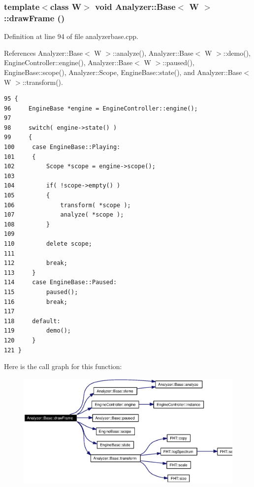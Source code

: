 \subsubsection{\setlength{\rightskip}{0pt plus 5cm}template$<$class W$>$ void {\bf Analyzer::Base}$<$ W $>$::draw\-Frame ()\hspace{0.3cm}{\tt  [protected]}}\label{classAnalyzer_1_1Base_Analyzer_1_1Baseb1}




Definition at line 94 of file analyzerbase.cpp.

References Analyzer::Base$<$ W $>$::analyze(), Analyzer::Base$<$ W $>$::demo(), Engine\-Controller::engine(), Analyzer::Base$<$ W $>$::paused(), Engine\-Base::scope(), Analyzer::Scope, Engine\-Base::state(), and Analyzer::Base$<$ W $>$::transform().



\footnotesize\begin{verbatim}95 {
96     EngineBase *engine = EngineController::engine();
97 
98     switch( engine->state() )
99     {
100     case EngineBase::Playing:
101     {
102         Scope *scope = engine->scope();
103 
104         if( !scope->empty() )
105         {
106             transform( *scope );
107             analyze( *scope );
108         }
109 
110         delete scope;
111 
112         break;
113     }
114     case EngineBase::Paused:
115         paused();
116         break;
117 
118     default:
119         demo();
120     }
121 }
\end{verbatim}\normalsize 


Here is the call graph for this function:\begin{figure}[H]
\begin{center}
\leavevmode
\includegraphics[width=393pt]{classAnalyzer_1_1Base_Analyzer_1_1Baseb1_cgraph}
\end{center}
\end{figure}
